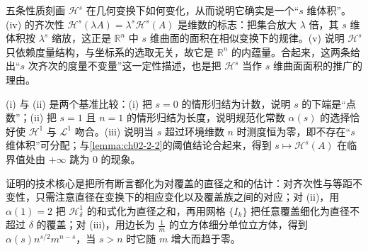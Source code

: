 \documentclass[../../main.tex]{subfiles}%
\begin{document}
\begin{remark}\label{remark:ch02-thm-2-2-动机}
五条性质刻画 $\mathcal{H}^s$ 在几何变换下如何变化，从而说明它确实是一个“$s$ 维体积”。(iv) 的齐次性 $\mathcal{H}^s(\lambda A)=\lambda^s\mathcal{H}^s(A)$ 是维数的标志：把集合放大 $\lambda$ 倍，其 $s$ 维体积按 $\lambda^s$ 缩放，这正是 $\mathbb{R}^n$ 中 $s$ 维曲面的面积在相似变换下的规律。(v) 说明 $\mathcal{H}^s$ 只依赖度量结构，与坐标系的选取无关，故它是 $\mathbb{R}^n$ 的内蕴量。合起来，这两条给出“$s$ 次齐次的度量不变量”这一定性描述，也是把 $\mathcal{H}^s$ 当作 $s$ 维曲面面积的推广的理由。

(i) 与 (ii) 是两个基准比较：(i) 把 $s=0$ 的情形归结为计数，说明 $s$ 的下端是“点数”；(ii) 把 $s=1$ 且 $n=1$ 的情形归结为长度，说明规范化常数 $\alpha(s)$ 的选择恰好使 $\mathcal{H}^1$ 与 $\mathcal{L}^1$ 吻合。(iii) 说明当 $s$ 超过环境维数 $n$ 时测度恒为零，即不存在“$s$ 维体积”可分配；与\cref{lemma:ch02-2-2}的阈值结论合起来，得到 $s\mapsto\mathcal{H}^s(A)$ 在临界值处由 $+\infty$ 跳为 $0$ 的现象。%

证明的技术核心是把所有断言都化为对覆盖的直径之和的估计：对齐次性与等距不变性，只需注意直径在变换下的相应变化以及覆盖族之间的对应；对 (ii)，用 $\alpha(1)=2$ 把 $\mathcal{H}^1_\delta$ 的和式化为直径之和，再用网格 $\{I_k\}$ 把任意覆盖细化为直径不超过 $\delta$ 的覆盖；对 (iii)，用边长为 $\frac1m$ 的立方体细分单位立方体，得到 $\alpha(s)n^{s/2}m^{n-s}$，当 $s>n$ 时它随 $m$ 增大而趋于零。
\end{remark}
\end{document}
